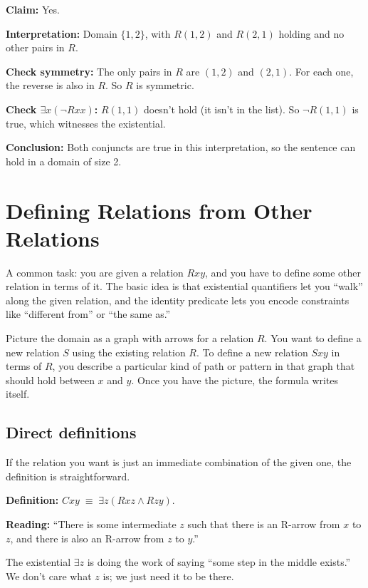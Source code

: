 \documentclass[11pt]{article}
\begin{document}
\begin{example}
\textbf{Claim:} Yes.

\textbf{Interpretation:} Domain $\{1, 2\}$, with $R(1,2)$ and $R(2,1)$ holding and no other pairs in $R$.

\textbf{Check symmetry:} The only pairs in $R$ are $(1,2)$ and $(2,1)$. For each one, the reverse is also in $R$. So $R$ is symmetric. \checkmark

\textbf{Check $\exists x(\neg Rxx)$:} $R(1,1)$ doesn't hold (it isn't in the list). So $\neg R(1,1)$ is true, which witnesses the existential. \checkmark

\textbf{Conclusion:} Both conjuncts are true in this interpretation, so the sentence can hold in a domain of size 2.
\end{example}

\section{Defining Relations from Other Relations}

A common task: you are given a relation $Rxy$, and you have to define some other relation in terms of it. The basic idea is that existential quantifiers let you ``walk'' along the given relation, and the identity predicate lets you encode constraints like ``different from'' or ``the same as.''

Picture the domain as a graph with arrows for a relation $R$. You want to define a new relation $S$  using the existing relation $R$. To define a new relation $Sxy$ in terms of $R$, you describe a particular kind of path or pattern in that graph that should hold between $x$ and $y$. Once you have the picture, the formula writes itself.

\subsection{Direct definitions}

If the relation you want is just an immediate combination of the given one, the definition is straightforward.

\begin{example}
\textbf{Definition:} $Cxy \;\equiv\; \exists z(Rxz \wedge Rzy)$.

\textbf{Reading:} ``There is some intermediate $z$ such that there is an R-arrow from $x$ to $z$, and there is also an R-arrow from $z$ to $y$.''

The existential $\exists z$ is doing the work of saying ``some step in the middle exists.'' We don't care what $z$ is; we just need it to be there.
\end{example}
\end{document}
